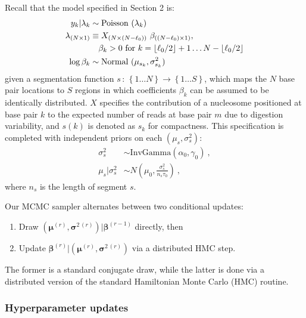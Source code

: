 \documentclass[12pt]{article}
\newcommand{\range}[2]{\left\{#1 \ldots #2\right\}}
\newcommand{\fnDef}[3]{#1 \,:\, #2 \rightarrow #3}
\begin{document}
Recall that the model specified in Section 2 is:
\begin{align}
 \label{eq:observation_model}
  y_k|\lambda_k         & \sim \hbox{Poisson } (\lambda_k) \\
 \label{eq:linear_model}
  \lambda_{(N\times 1)} & \equiv X_{(N\times (N - \ell_0))} ~ \beta_{((N - \ell_0)\times 1)}, \\
\nonumber & \quad \beta_k>0 \hbox{ for } k=\lfloor \ell_0 / 2 \rfloor + 1 \dots N - \lfloor \ell_0 / 2 \rfloor \\
\label{eq:positioning_model}
  \log \beta_k        & \sim \hbox{Normal } (\mu_{s_k},\sigma^2_{s_k})
\end{align}
given a segmentation function $\fnDef{s}{\range{1}{N}}{\range{1}{S}}$, which maps the $N$ base pair locations to $S$ regions in which coefficients $\beta_k$ can be assumed to be identically distributed.
$X$ specifies the contribution of a nucleosome positioned at base pair $k$ to the expected number of reads at base pair $m$ due to digestion variability, and $s(k)$ is denoted as $s_k$ for compactness.
This specification is completed with independent priors on each $(\mu_s, \sigma^2_s)$:
\begin{align}
\sigma^2_{s} &\sim \mathrm{InvGamma}(\alpha_0, \gamma_0) \ , \\
\mu_{s} | \sigma^2_{s} &\sim N(\mu_0, \frac{\sigma^2_{s}}{n_{s} \tau_0}) \ ,
\end{align}
where $n_{s}$ is the length of segment $s$.

Our MCMC sampler alternates between two conditional updates:
\begin{enumerate}
 \item Draw $(\bm \mu^{(r)}, \bm \sigma^{2\,(r)}) | \bm \beta^{(r-1)}$ directly, then
 \item Update $\bm \beta^{(r)} | (\bm \mu^{(r)}, \bm \sigma^{2\,(r)})$ via a distributed HMC step.
\end{enumerate}
The former is a standard conjugate draw, while the latter is done via a distributed version of the standard Hamiltonian Monte Carlo (HMC) routine.

\subsubsection{Hyperparameter updates}
\end{document}
